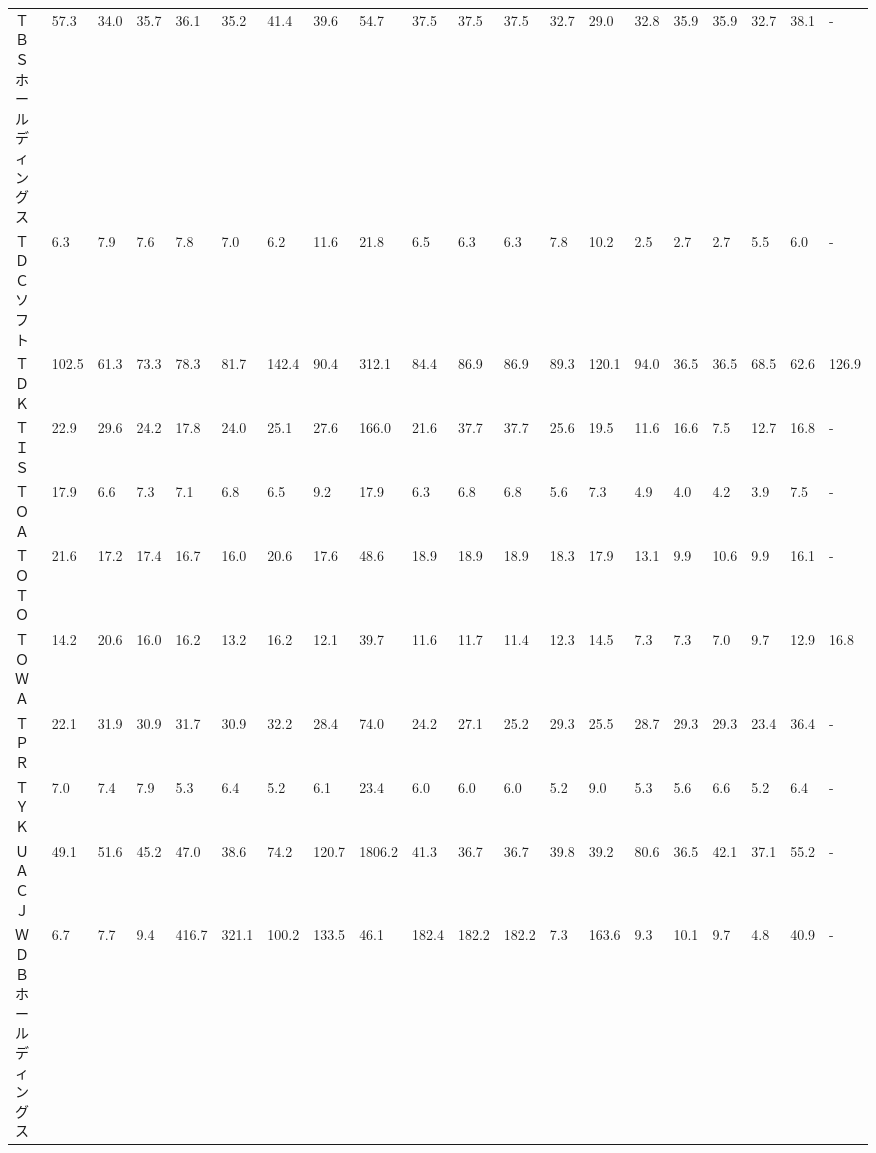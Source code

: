 \begin{longtable}[c]{lp{3mm}p{3mm}p{3mm}p{3mm}p{3mm}p{3mm}p{3mm}p{3mm}p{3mm}p{3mm}p{3mm}p{3mm}p{3mm}p{3mm}p{3mm}p{3mm}p{3mm}p{3mm}p{3mm}}
ＴＢＳホールディングス     &   57.3 &   34.0 &      35.7 &      36.1 &       35.2 &    41.4 &    39.6 &     54.7 &    37.5 &    37.5 &   37.5 &   32.7 &    29.0 &    32.8 &    35.9 &   35.9 &   32.7 &    38.1 &      - \\
ＴＤＣソフト          &    6.3 &    7.9 &       7.6 &       7.8 &        7.0 &     6.2 &    11.6 &     21.8 &     6.5 &     6.3 &    6.3 &    7.8 &    10.2 &     2.5 &     2.7 &    2.7 &    5.5 &     6.0 &      - \\
ＴＤＫ             &  102.5 &   61.3 &      73.3 &      78.3 &       81.7 &   142.4 &    90.4 &    312.1 &    84.4 &    86.9 &   86.9 &   89.3 &   120.1 &    94.0 &    36.5 &   36.5 &   68.5 &    62.6 &  126.9 \\
ＴＩＳ             &   22.9 &   29.6 &      24.2 &      17.8 &       24.0 &    25.1 &    27.6 &    166.0 &    21.6 &    37.7 &   37.7 &   25.6 &    19.5 &    11.6 &    16.6 &    7.5 &   12.7 &    16.8 &      - \\
ＴＯＡ             &   17.9 &    6.6 &       7.3 &       7.1 &        6.8 &     6.5 &     9.2 &     17.9 &     6.3 &     6.8 &    6.8 &    5.6 &     7.3 &     4.9 &     4.0 &    4.2 &    3.9 &     7.5 &      - \\
ＴＯＴＯ            &   21.6 &   17.2 &      17.4 &      16.7 &       16.0 &    20.6 &    17.6 &     48.6 &    18.9 &    18.9 &   18.9 &   18.3 &    17.9 &    13.1 &     9.9 &   10.6 &    9.9 &    16.1 &      - \\
ＴＯＷＡ            &   14.2 &   20.6 &      16.0 &      16.2 &       13.2 &    16.2 &    12.1 &     39.7 &    11.6 &    11.7 &   11.4 &   12.3 &    14.5 &     7.3 &     7.3 &    7.0 &    9.7 &    12.9 &   16.8 \\
ＴＰＲ             &   22.1 &   31.9 &      30.9 &      31.7 &       30.9 &    32.2 &    28.4 &     74.0 &    24.2 &    27.1 &   25.2 &   29.3 &    25.5 &    28.7 &    29.3 &   29.3 &   23.4 &    36.4 &      - \\
ＴＹＫ             &    7.0 &    7.4 &       7.9 &       5.3 &        6.4 &     5.2 &     6.1 &     23.4 &     6.0 &     6.0 &    6.0 &    5.2 &     9.0 &     5.3 &     5.6 &    6.6 &    5.2 &     6.4 &      - \\
ＵＡＣＪ            &   49.1 &   51.6 &      45.2 &      47.0 &       38.6 &    74.2 &   120.7 &   1806.2 &    41.3 &    36.7 &   36.7 &   39.8 &    39.2 &    80.6 &    36.5 &   42.1 &   37.1 &    55.2 &      - \\
ＷＤＢホールディングス     &    6.7 &    7.7 &       9.4 &     416.7 &      321.1 &   100.2 &   133.5 &     46.1 &   182.4 &   182.2 &  182.2 &    7.3 &   163.6 &     9.3 &    10.1 &    9.7 &    4.8 &    40.9 &      - \\

\end{longtable}
